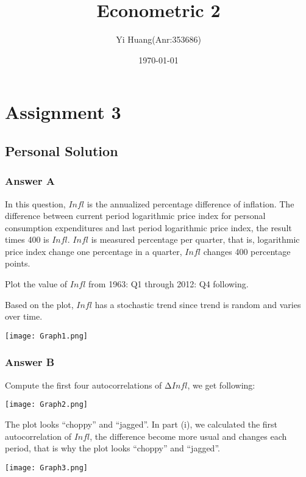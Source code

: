 \documentclass{beamer}
\title{Econometric 2}
\author{Yi Huang(Anr:353686)}
\institute{Tilburg University}
\date{\today}
\begin{document}
	\section{Assignment 3}
	\subsection{Personal Solution}
	\begin{frame}
		\titlepage
	\end{frame}
	\begin{frame}[allowframebreaks]
		\frametitle{Answer A}
		\structure{A.i.}
		
		In this question, $Infl$ is the annualized percentage difference of inflation. The difference between current period logarithmic price index for personal consumption expenditures and last period logarithmic price index, the result times 400 is $Infl$. $Infl$ is measured percentage per quarter, that is, logarithmic price index change one percentage in a quarter, $Infl$ changes 400 percentage points.
		\vspace{11pt}
		
		\structure{A.ii.}
		
		Plot the value of $Infl$ from 1963: Q1 through 2012: Q4 following.
		
		Based on the plot, $Infl$ has a stochastic trend since trend is random and varies over time.
		\pause 
		
		\texttt{[image: Graph1.png]}
	\end{frame}
	\begin{frame}[allowframebreaks]
		\frametitle{Answer B}
			\structure{B.i.}
			
			Compute the first four autocorrelations of $∆Infl$, we get following:
			\vspace{11pt}
			
			\texttt{[image: Graph2.png]}
			\vspace{6pt}
			
			\structure{B.ii.}
			
			The plot looks “choppy” and “jagged”.
			In part (i), we calculated the first autocorrelation of $Infl$, the difference become more usual and changes each period, that is why the plot looks “choppy” and “jagged”.
			\pause
			
			\texttt{[image: Graph3.png]}
			

	\end{frame}
\end{document}
